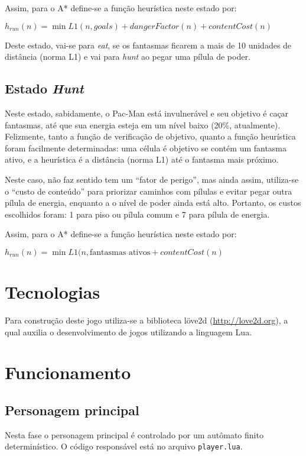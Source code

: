 \documentclass[a4paper]{scrartcl}
\begin{document}
Assim, para o A* define-se a função heurística neste estado por:

$h_{run}(n) = \min{L1(n, goals)} + dangerFactor(n) + contentCost(n)$

Deste estado, vai-se para \textit{eat}, se os fantasmas ficarem a mais de 10 unidades de distância (norma L1) e vai para \textit{hunt} ao pegar uma pílula de poder.

\subsection{Estado \textit{Hunt}}

Neste estado, sabidamente, o Pac-Man está invulnerável e seu objetivo é caçar fantasmas, até que sua
energia esteja em um nível baixo (20\%, atualmente). Felizmente, tanto a função de verificação
de objetivo, quanto a função heurística foram facilmente determinadas:
uma célula é objetivo se contém um fantasma ativo, e a heurística é a distância (norma L1) até o fantasma mais próximo.

Neste caso, não faz sentido tem um ``fator de perigo'', mas ainda assim, utiliza-se o ``custo de conteúdo'' para priorizar caminhos com pílulas e evitar pegar outra pílula de energia, enquanto a
o nível de poder ainda está alto. Portanto, os custos escolhidos foram: 1 para piso ou pílula comum e 7 para pílula de energia.

Assim, para o A* define-se a função heurística neste estado por:

$h_{run}(n) = \min{L1(n, \text{fantasmas ativos}} + contentCost(n)$

\section{Tecnologias}

Para construção deste jogo utiliza-se a biblioteca löve2d (\url{http://love2d.org}),
a qual auxilia o desenvolvimento de jogos utilizando a linguagem Lua.

\section{Funcionamento}

\subsection{Personagem principal}

Nesta fase o personagem principal é controlado por um autômato finito determinístico.
O código responsável está no arquivo \texttt{player.lua}.
\end{document}
